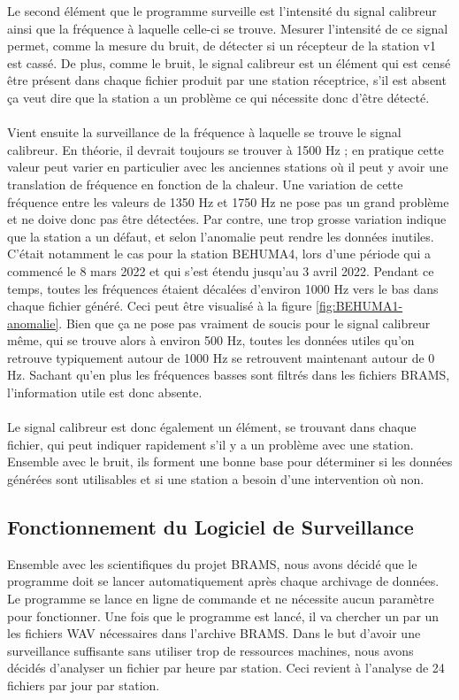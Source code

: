 \documentclass[11pt]{article}
\begin{document}
Le second élément que le programme surveille est l'intensité du signal calibreur ainsi que la fréquence à laquelle celle-ci se trouve.
Mesurer l'intensité de ce signal permet, comme la mesure du bruit, de détecter si un récepteur de la station v1 est cassé.
De plus, comme le bruit, le signal calibreur est un élément qui est censé être présent dans chaque fichier produit par une station réceptrice, s'il est absent ça veut dire que la station a un problème ce qui nécessite donc d'être détecté.\\
\\
Vient ensuite la surveillance de la fréquence à laquelle se trouve le signal calibreur.
En théorie, il devrait toujours se trouver à 1500 Hz ; en pratique cette valeur peut varier en particulier avec les anciennes stations où il peut y avoir une translation de fréquence en fonction de la chaleur.
Une variation de cette fréquence entre les valeurs de 1350 Hz et 1750 Hz ne pose pas un grand problème et ne doive donc pas être détectées.
Par contre, une trop grosse variation indique que la station a un défaut, et selon l'anomalie peut rendre les données inutiles.
C'était notamment le cas pour la station BEHUMA4, lors d'une période qui a commencé le 8 mars 2022 et qui s'est étendu jusqu'au 3 avril 2022.
Pendant ce temps, toutes les fréquences étaient décalées d'environ 1000 Hz vers le bas dans chaque fichier généré.
Ceci peut être visualisé à la figure \ref{fig:BEHUMA1-anomalie}.
Bien que ça ne pose pas vraiment de soucis pour le signal calibreur même, qui se trouve alors à environ 500 Hz, toutes les données utiles qu'on retrouve typiquement autour de 1000 Hz se retrouvent maintenant autour de 0 Hz.
Sachant qu'en plus les fréquences basses sont filtrés dans les fichiers BRAMS, l'information utile est donc absente.\\
\\
Le signal calibreur est donc également un élément, se trouvant dans chaque fichier, qui peut indiquer rapidement s'il y a un problème avec une station.
Ensemble avec le bruit, ils forment une bonne base pour déterminer si les données générées sont utilisables et si une station a besoin d'une intervention où non.

\subsection{Fonctionnement du Logiciel de Surveillance}

Ensemble avec les scientifiques du projet BRAMS, nous avons décidé que le programme doit se lancer automatiquement après chaque archivage de données.
Le programme se lance en ligne de commande et ne nécessite aucun paramètre pour fonctionner.
Une fois que le programme est lancé, il va chercher un par un les fichiers WAV nécessaires dans l'archive BRAMS.
Dans le but d'avoir une surveillance suffisante sans utiliser trop de ressources machines, nous avons décidés d'analyser un fichier par heure par station.
Ceci revient à l'analyse de 24 fichiers par jour par station.
\end{document}
